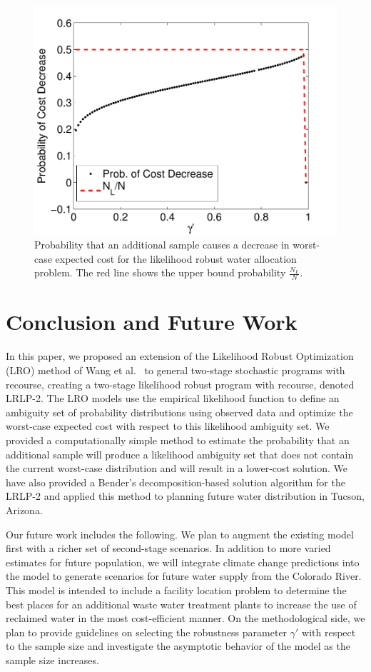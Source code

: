 \documentclass[11pt]{article}
\begin{document}
\begin{figure}
	\centering
	\includegraphics[width=.5\textwidth]{images/water_prob_decrease}
	\caption{Probability that an additional sample causes a decrease in worst-case expected cost for the likelihood robust water allocation problem.  The red line shows the upper bound probability $\tfrac{N_L}{N}$.}
	\label{fig:water_prob_decrease}
\end{figure}

\section{Conclusion and Future Work}
\label{sec:concl}

In this paper, we proposed an extension of the Likelihood Robust Optimization (LRO) method of Wang et al.\ \cite{wang2010likelihood} to general two-stage stochastic programs with recourse, creating a two-stage likelihood robust program with recourse, denoted LRLP-2.
The LRO models use the empirical likelihood function to define an ambiguity set of probability distributions using observed data and optimize the worst-case expected cost with respect to this likelihood ambiguity set.
We provided a computationally simple method to estimate the probability that an additional sample will produce a likelihood ambiguity set that does not contain the current worst-case distribution and will result in a lower-cost solution. 
We have also provided a Bender's decomposition-based solution algorithm for the LRLP-2 and applied this method to planning future water distribution in Tucson, Arizona.

Our future work includes the following. We plan to augment the existing model first with a richer set of second-stage scenarios.
In addition to more varied estimates for future population, we will integrate climate change predictions into the model to generate scenarios for future water supply from the Colorado River. 
This model is intended to include a facility location problem to determine the best places for an additional waste water treatment plants to increase the use of reclaimed water in the most cost-efficient manner. On the methodological side, we plan to provide guidelines on selecting the robustness parameter $\gamma'$ with respect to the sample size and investigate the asymptotic behavior of the model as the sample size increases. 
\end{document}
